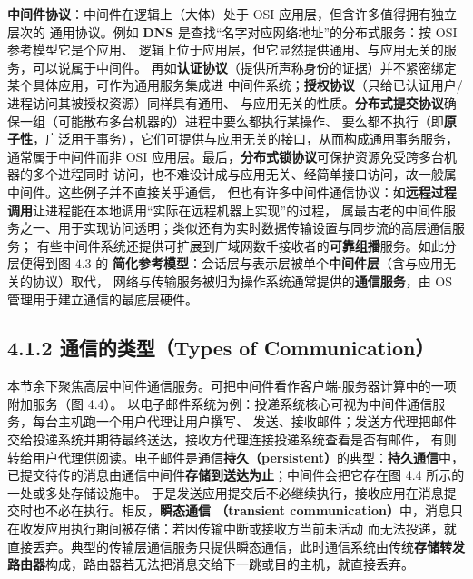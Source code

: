 \medskip\noindent\textbf{中间件协议}：中间件在逻辑上（大体）处于 OSI 应用层，但含许多值得拥有独立层次的
通用协议。例如 \textbf{DNS} 是查找“名字对应网络地址”的分布式服务：按 OSI 参考模型它是个应用、
逻辑上位于应用层，但它显然提供通用、与应用无关的服务，可以说属于中间件。
再如\textbf{认证协议}（提供所声称身份的证据）并不紧密绑定某个具体应用，可作为通用服务集成进
中间件系统；\textbf{授权协议}（只给已认证用户/进程访问其被授权资源）同样具有通用、
与应用无关的性质。\textbf{分布式提交协议}确保一组（可能散布多台机器的）进程中要么都执行某操作、
要么都不执行（即\textbf{原子性}，广泛用于事务），它们可提供与应用无关的接口，从而构成通用事务服务，
通常属于中间件而非 OSI 应用层。最后，\textbf{分布式锁协议}可保护资源免受跨多台机器的多个进程同时
访问，也不难设计成与应用无关、经简单接口访问，故一般属中间件。这些例子并不直接关乎通信，
但也有许多中间件通信协议：如\textbf{远程过程调用}让进程能在本地调用“实际在远程机器上实现”的过程，
属最古老的中间件服务之一、用于实现访问透明；类似还有为实时数据传输设置与同步流的高层通信服务；
有些中间件系统还提供可扩展到广域网数千接收者的\textbf{可靠组播}服务。如此分层便得到图 4.3 的
\textbf{简化参考模型}：会话层与表示层被单个\textbf{中间件层}（含与应用无关的协议）取代，
网络与传输服务被归为操作系统通常提供的\textbf{通信服务}，由 OS 管理用于建立通信的最底层硬件。

\begin{closeread}
\end{closeread}


\subsection*{4.1.2 通信的类型（Types of Communication）}
本节余下聚焦高层中间件通信服务。可把中间件看作客户端-服务器计算中的一项附加服务（图 4.4）。
以电子邮件系统为例：投递系统核心可视为中间件通信服务，每台主机跑一个用户代理让用户撰写、
发送、接收邮件；发送方代理把邮件交给投递系统并期待最终送达，接收方代理连接投递系统查看是否有邮件，
有则转给用户代理供阅读。电子邮件是通信\textbf{持久（persistent）}的典型：\textbf{持久通信}中，
已提交待传的消息由通信中间件\textbf{存储到送达为止}；中间件会把它存在图 4.4 所示的一处或多处存储设施中。
于是发送应用提交后不必继续执行，接收应用在消息提交时也不必在执行。相反，\textbf{瞬态通信
（transient communication）}中，消息只在收发应用执行期间被存储：若因传输中断或接收方当前未活动
而无法投递，就直接丢弃。典型的传输层通信服务只提供瞬态通信，此时通信系统由传统\textbf{存储转发
路由器}构成，路由器若无法把消息交给下一跳或目的主机，就直接丢弃。

